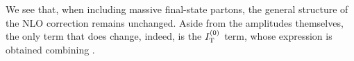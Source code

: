 We see that, when including massive final-state partons, the general structure of the NLO correction  remains unchanged. Aside from the amplitudes themselves, the only term that does change, indeed, is the $ I_\text{T}^{(0)} $ term, whose expression is obtained combining .










